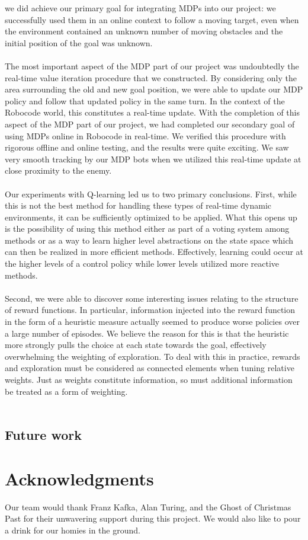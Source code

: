 \documentclass{aiaa-tc}%
\begin{document}
we did achieve our primary goal for integrating MDPs into our project: we successfully used them in an online context to follow a moving target, even when the environment contained an unknown number of moving obstacles and the initial position
of the goal was unknown. \\ \\
The most important aspect of the MDP part of our project was undoubtedly the real-time value iteration procedure that we constructed. By considering only the area surrounding the old and new goal position, we were able to update our MDP policy and follow
that updated policy in the same turn. In the context of the Robocode world, this constitutes a real-time update. With the completion of this aspect of the MDP part of our project, we had completed our secondary goal of using MDPs online in Robocode in real-time. We verified this
procedure with rigorous offline and online testing, and the results were quite exciting. We saw very smooth tracking by our MDP bots when we utilized this real-time update at close proximity to the enemy. \\ \\
Our experiments with Q-learning led us to two primary conclusions. First, while this is not the best method for handling these types of real-time dynamic environments, it can be sufficiently optimized to be applied. What this opens up is the possibility of using this method either as part of a voting system among methods or as a way to learn higher level abstractions on the state space which can then be realized in more efficient methods. Effectively, learning could occur at the higher levels of a control policy while lower levels utilized more reactive methods. \\ \\
Second, we were able to discover some interesting issues relating to the structure of reward functions. In particular, information injected into the reward function in the form of a heuristic measure actually seemed to produce worse policies over a large number of episodes. We believe the reason for this is that the heuristic more strongly pulls the choice at each state towards the goal, effectively overwhelming the weighting of exploration. To deal with this in practice, rewards and exploration must be considered as connected elements when tuning relative weights. Just as weights constitute information, so must additional information be treated as a form of weighting. \\ \\

\subsection{Future work}

\section{Acknowledgments}
Our team would thank Franz Kafka, Alan Turing, and the Ghost of
Christmas Past for their unwavering support during this project. We
would also like to pour a drink for our homies in the ground.


% 

% 
\end{document}
